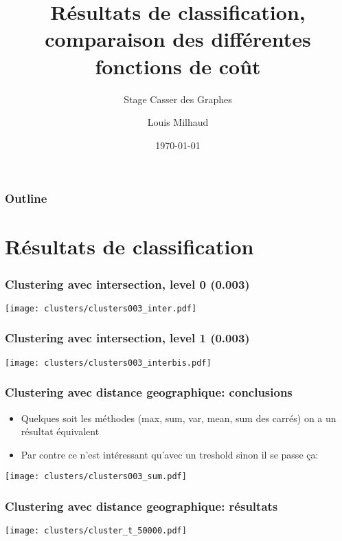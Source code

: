 \documentclass[aspectratio=169]{beamer}
\title{Résultats de classification, comparaison des différentes fonctions de coût}
\subtitle{Stage Casser des Graphes}
\author{Louis Milhaud}
\institute{Complex Networks - LIP6}
\date{\today}
\begin{document}
    \begin{frame}
        \titlepage
    \end{frame}

    \begin{frame}
        \frametitle{Outline}
        \tableofcontents
    \end{frame}

    \section{Résultats de classification}
    \begin{frame}
        \frametitle{Clustering avec intersection, level 0 (0.003)}
        \centering
        \texttt{[image: clusters/clusters003\_inter.pdf]}
    
    \end{frame}
    
    \begin{frame}
        \frametitle{Clustering avec intersection, level 1 (0.003)}
        \centering
        \texttt{[image: clusters/clusters003\_interbis.pdf]}
    \end{frame}
    
    \begin{frame}
        \frametitle{Clustering avec distance geographique: conclusions}
        \begin{itemize}
            \item Quelques soit les méthodes (max, sum, var, mean, sum des carrés) on a un résultat équivalent
            \item Par contre ce n'est intéressant qu'avec un treshold sinon il se passe ça:
        \end{itemize}
        \centering
        \texttt{[image: clusters/clusters003\_sum.pdf]}
    \end{frame}
    
    \begin{frame}
        \frametitle{Clustering avec distance geographique: résultats}
        \centering
        \texttt{[image: clusters/cluster\_t\_50000.pdf]}
    \end{frame}
\end{document}
